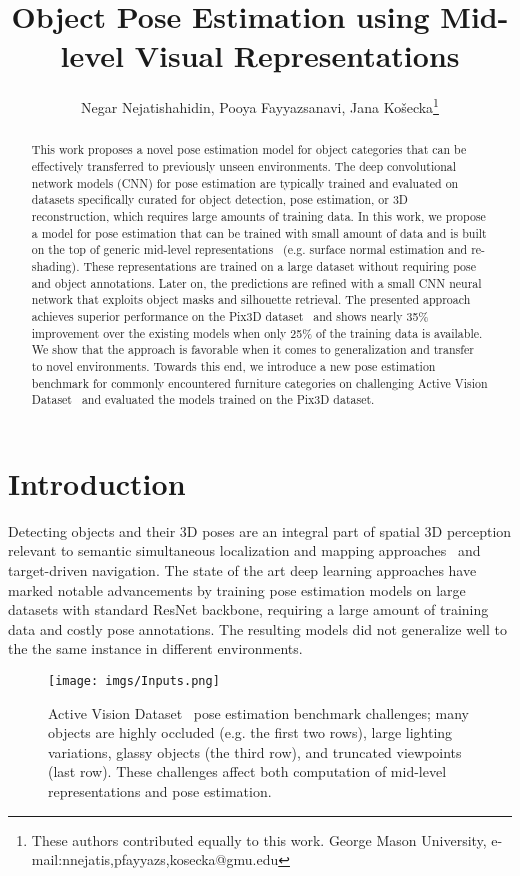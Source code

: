 \documentclass[letterpaper, 10 pt, conference]{ieeeconf}  \pdfoutput=1
\title{\LARGE \bf
Object Pose Estimation using Mid-level Visual Representations}
\author{Negar Nejatishahidin, Pooya Fayyazsanavi, Jana Ko\v{s}ecka\thanks{These authors contributed equally to this work. George Mason University, e-mail:{nnejatis,pfayyazs,kosecka}@gmu.edu}
}
\begin{document}
\maketitle
\thispagestyle{empty}
\pagestyle{empty}


\begin{abstract}
This work proposes a novel pose estimation model for object categories that can be effectively transferred to previously unseen environments.
The deep convolutional network models (CNN) for pose estimation are typically trained and evaluated on datasets specifically curated for object detection, pose estimation, or 3D reconstruction, which requires large amounts of training data. In this work, we propose a model for pose estimation that can be trained with small amount of data and is built on the top of generic mid-level
representations~\cite{taskonomy2018}  (e.g. surface normal estimation and
re-shading). These representations are trained on a large dataset without requiring pose and object annotations. Later on, the predictions are refined with a small CNN neural network that exploits object masks and silhouette retrieval. The presented approach achieves superior performance on the Pix3D dataset~\cite{pix3d} and shows nearly 35\% improvement over the existing models when only 25\% of the training data is available.  We show that the approach is favorable when it comes to generalization and transfer to novel environments. Towards this end, we introduce a new pose estimation benchmark for commonly encountered furniture categories on challenging Active Vision Dataset~\cite{Ammirato2017ADF} and evaluated the models trained on the Pix3D dataset.

\end{abstract}

\section{Introduction}
Detecting objects and their 3D poses are an integral part of spatial 3D perception relevant to 
semantic simultaneous localization and mapping approaches~\cite{SLAM++} and target-driven navigation. 
The state of the art deep learning approaches have marked notable advancements by training
pose estimation models on large datasets with standard ResNet \cite{He2016DeepRL} backbone, requiring a large amount of training data and costly pose annotations. The resulting models did not generalize well to the the same instance in different environments. 


\begin{figure}[t]
\begin{center}
\texttt{[image: imgs/Inputs.png]}
\end{center}
   \caption{Active Vision Dataset~\cite{Ammirato2017ADF} pose estimation benchmark challenges; many objects are highly occluded (e.g. the first two rows), large lighting variations, glassy objects (the third row), and truncated viewpoints (last row). These challenges affect both computation of mid-level representations and pose estimation.}
\label{AVD_sample}
\end{figure}
\end{document}
